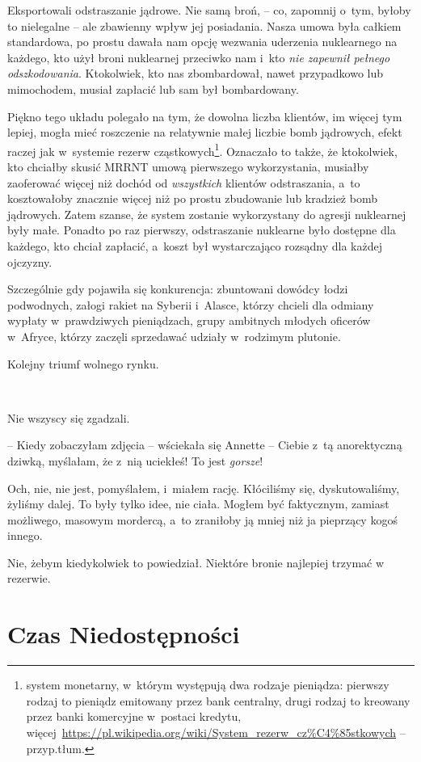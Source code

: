 \documentclass[oneside,polish,11pt,sfheadings]{mwbk}
\begin{document}
Eksportowali odstraszanie jądrowe. Nie samą broń, -- co, zapomnij o~tym,
byłoby to nielegalne -- ale zbawienny wpływ jej posiadania. Nasza umowa była
całkiem standardowa, po prostu dawała nam opcję wezwania uderzenia
nuklearnego na każdego, kto użył broni nuklearnej przeciwko nam i~kto
\emph{nie zapewnił pełnego odszkodowania}. Ktokolwiek, kto nas
zbombardował, nawet przypadkowo lub mimochodem, musiał zapłacić lub sam
był bombardowany.

Piękno tego układu polegało na tym, że dowolna liczba klientów, im
więcej tym lepiej, mogła mieć roszczenie na relatywnie małej liczbie
bomb jądrowych, efekt raczej jak w~systemie rezerw cząstkowych\footnote{
system monetarny, w~którym występują dwa rodzaje pieniądza: pierwszy
rodzaj to pieniądz emitowany przez bank centralny, drugi rodzaj to
kreowany przez banki komercyjne w~postaci kredytu,
więcej~\url{https://pl.wikipedia.org/wiki/System_rezerw_cz\%C4\%85stkowych} -- przyp.tłum.}. Oznaczało to także, że ktokolwiek, kto chciałby skusić
MRRNT umową pierwszego wykorzystania, musiałby zaoferować więcej niż
dochód od \emph{wszystkich} klientów odstraszania, a~to kosztowałoby
znacznie więcej niż po prostu zbudowanie lub kradzież bomb jądrowych.
Zatem szanse, że system zostanie wykorzystany do agresji nuklearnej były
małe. Ponadto po raz pierwszy, odstraszanie nuklearne było dostępne dla
każdego, kto chciał zapłacić, a~koszt był wystarczająco rozsądny dla
każdej ojczyzny.

Szczególnie gdy pojawiła się konkurencja: zbuntowani dowódcy łodzi
podwodnych, załogi rakiet na Syberii i~Alasce, którzy chcieli dla
odmiany wypłaty w~prawdziwych pieniądzach, grupy ambitnych młodych
oficerów w~Afryce, którzy zaczęli sprzedawać udziały w~rodzimym
plutonie.

Kolejny triumf wolnego rynku.

~

Nie wszyscy się zgadzali.

-- Kiedy zobaczyłam zdjęcia -- wściekała się Annette -- Ciebie z~tą
anorektyczną dziwką, myślałam, że z~nią uciekłeś! To jest \emph{gorsze}!

Och, nie, nie jest, pomyślałem, i~miałem rację. Kłóciliśmy się,
dyskutowaliśmy, żyliśmy dalej. To były tylko idee, nie ciała. Mogłem być
faktycznym, zamiast możliwego, masowym mordercą, a~to zraniłoby ją mniej
niż ja pieprzący kogoś innego.

Nie, żebym kiedykolwiek to powiedział. Niektóre bronie najlepiej trzymać
w rezerwie.

\chapter{Czas Niedostępności}
\end{document}
